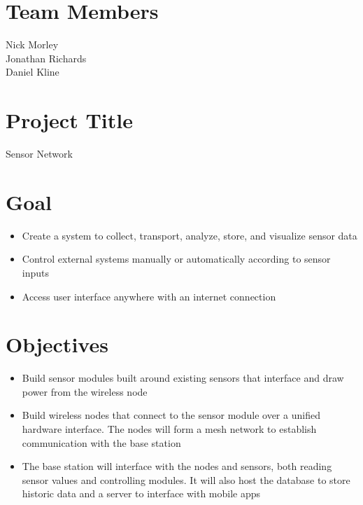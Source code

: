 


  	
	\section{Team Members}
		Nick Morley\\
		Jonathan Richards\\
		Daniel Kline\\
		 
	\section{Project Title}
		Sensor Network 
	
	\section{Goal}
		\begin{itemize}
			\item Create a system to collect, transport, analyze, store, and visualize sensor data
			\item Control external systems manually or automatically according to sensor inputs
			\item Access user interface anywhere with an internet connection
		\end{itemize}
		
	\section{Objectives}
		\begin{itemize}
			\item Build sensor modules built around existing sensors that interface and draw power from the wireless node
			\item Build wireless nodes that connect to the sensor module over a unified hardware interface. The nodes will form a mesh network to establish communication with the base station
			\item The base station will interface with the nodes and sensors, both reading sensor values and controlling modules. It will also host the database to store historic data and a server to interface with mobile apps
		\end{itemize}
 
	 	 
